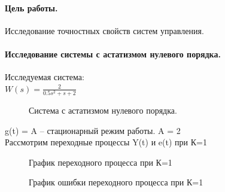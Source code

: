 \documentclass[a4paper, 11pt]{article}
\begin{document}
\paragraph{Цель работы.}Исследование точностных свойств систем управления.
\paragraph{Исследование системы с астатизмом нулевого порядка.}Исследуемая система:\\
\large{$W(s)= \frac {2} {0.5s^2+s+2}$}

\begin{figure}[h]
    \caption{Система с астатизмом нулевого порядка.}
    \label{one}
\end{figure}

g(t) = A – стационарный режим работы. A = 2\\

Рассмотрим переходные процессы Y(t) и e(t) при К=1

\begin{figure}[h!]
    \caption{График переходного процесса при К=1}
    \label{two}
\end{figure}



\begin{figure}[h!]
    \caption{График ошибки переходного процесса при К=1}
    \label{tree}
\end{figure}
\end{document}
